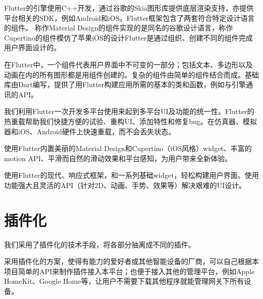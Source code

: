 Flutter的引擎使用C++开发，通过谷歌的Skia图形库提供底层渲染支持，亦提供平台相关的SDK，例如Android和iOS。Flutter框架包含了两套符合特定设计语言的组件。 称作Material Design的组件实现的是同名的谷歌设计语言，称作Cupertino的组件模仿了苹果iOS的设计Flutter是通过组织、创建不同的组件完成用户界面设计的。 

在Flutter中，一个组件代表用户界面中不可变的一部分；包括文本、多边形以及动画在内的所有图形都是用组件创建的。复杂的组件由简单的组件结合而成。基础库由Dart编写，提供了用Flutter构建应用所需的基本的类和函数，例如与引擎通讯的API。\cite{flutter}

我们利用Flutter一次开发多平台使用来起到多平台UI及功能的统一性。Flutter的热重载帮助我们快捷方便的试验、重构UI、添加特性和修复bug。在仿真器、模拟器和iOS、Android硬件上快速重载，而不会丢失状态。

使用Flutter内置美丽的Material Design和Cupertino（iOS风格）widget、丰富的motion API、平滑而自然的滑动效果和平台感知，为用户带来全新体验。

使用Flutter的现代、响应式框架，和一系列基础widget，轻松构建用户界面。使用功能强大且灵活的API（针对2D、动画、手势、效果等）解决艰难的UI设计。\cite{quickdev}

\section{插件化}
我们采用了插件化的技术手段，将各部分抽离成不同的插件。

采用插件化的方案，使得有能力的爱好者或其他智能设备的厂商，可以自己根据本项目简单的API来制作插件接入本平台；也便于接入其他的管理平台，例如Apple HomeKit、Google Home等，让用户不需要下载其他程序就能管理网关下所有设备。